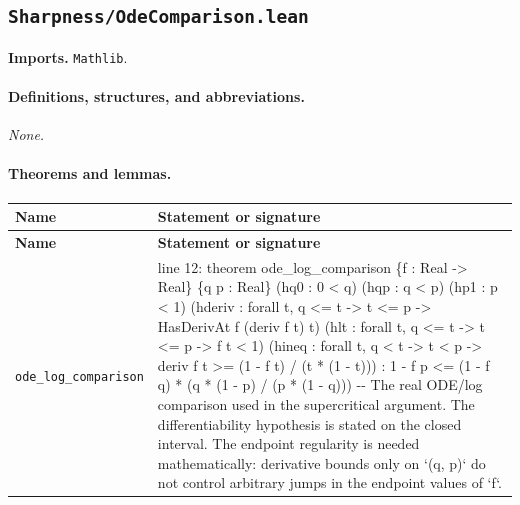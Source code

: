 \documentclass[10pt]{article}
\newcommand{\module}[1]{\texttt{#1}}
\begin{document}
\subsection*{\module{Sharpness/OdeComparison.lean}}
\textbf{Imports.} \module{Mathlib}.
\paragraph{Definitions, structures, and abbreviations.}
\emph{None.}

\paragraph{Theorems and lemmas.}
\begin{longtable}{>{\raggedright\arraybackslash}p{} >{\raggedright\arraybackslash}p{}}
\textbf{Name} & \textbf{Statement or signature} \\
\hline
\endfirsthead
\textbf{Name} & \textbf{Statement or signature} \\
\hline
\endhead
\texttt{ode\_\allowbreak{}log\_\allowbreak{}comparison} & {\ttfamily\scriptsize line 12:\allowbreak{} theorem ode\_\allowbreak{}log\_\allowbreak{}comparison \{f :\allowbreak{} Real -\allowbreak{}> Real\} \{q p :\allowbreak{} Real\} (\allowbreak{}hq0 :\allowbreak{} 0 < q)\allowbreak{} (\allowbreak{}hqp :\allowbreak{} q < p)\allowbreak{} (\allowbreak{}hp1 :\allowbreak{} p < 1)\allowbreak{} (\allowbreak{}hderiv :\allowbreak{} forall t,\allowbreak{} q <=\allowbreak{} t -\allowbreak{}> t <=\allowbreak{} p -\allowbreak{}> HasDerivAt f (\allowbreak{}deriv f t)\allowbreak{} t)\allowbreak{} (\allowbreak{}hlt :\allowbreak{} forall t,\allowbreak{} q <=\allowbreak{} t -\allowbreak{}> t <=\allowbreak{} p -\allowbreak{}> f t < 1)\allowbreak{} (\allowbreak{}hineq :\allowbreak{} forall t,\allowbreak{} q < t -\allowbreak{}> t < p -\allowbreak{}> deriv f t >=\allowbreak{} (\allowbreak{}1 -\allowbreak{} f t)\allowbreak{} /\allowbreak{} (\allowbreak{}t *\allowbreak{} (\allowbreak{}1 -\allowbreak{} t)\allowbreak{})\allowbreak{})\allowbreak{} :\allowbreak{} 1 -\allowbreak{} f p <=\allowbreak{} (\allowbreak{}1 -\allowbreak{} f q)\allowbreak{} *\allowbreak{} (\allowbreak{}q *\allowbreak{} (\allowbreak{}1 -\allowbreak{} p)\allowbreak{} /\allowbreak{} (\allowbreak{}p *\allowbreak{} (\allowbreak{}1 -\allowbreak{} q)\allowbreak{})\allowbreak{})\allowbreak{} -\allowbreak{}-\allowbreak{} The real ODE/\allowbreak{}log comparison used in the supercritical argument.\allowbreak{} The differentiability hypothesis is stated on the closed interval.\allowbreak{} The endpoint regularity is needed mathematically:\allowbreak{} derivative bounds only on `(\allowbreak{}q,\allowbreak{} p)\allowbreak{}` do not control arbitrary jumps in the endpoint values of `f`.\allowbreak{}} \\[0.45em]
\end{longtable}
\end{document}
